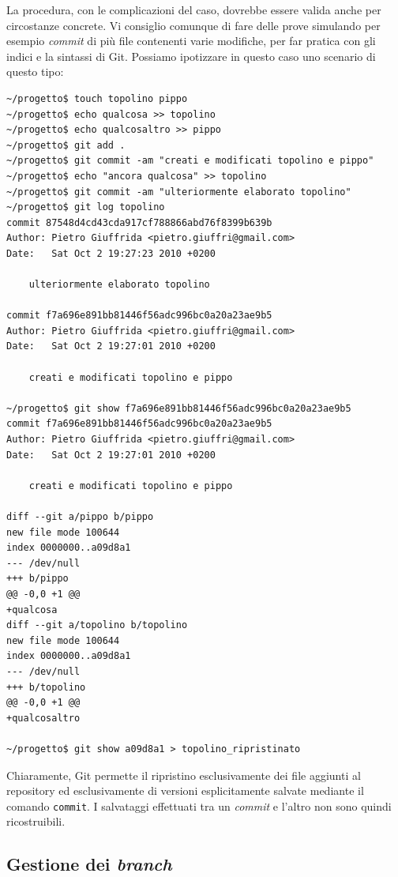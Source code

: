 \documentclass[a4paper,12pt,oneside]{article}
\begin{document}
La procedura, con le complicazioni del caso, dovrebbe essere valida anche per
circostanze concrete. Vi consiglio comunque di fare delle prove simulando per
esempio \emph{commit} di più file contenenti varie modifiche, per far pratica
con gli indici e la sintassi di Git.
Possiamo ipotizzare in questo caso uno scenario di questo tipo:
\begin{lstlisting}
~/progetto$ touch topolino pippo
~/progetto$ echo qualcosa >> topolino
~/progetto$ echo qualcosaltro >> pippo
~/progetto$ git add .
~/progetto$ git commit -am "creati e modificati topolino e pippo"
~/progetto$ echo "ancora qualcosa" >> topolino
~/progetto$ git commit -am "ulteriormente elaborato topolino"
~/progetto$ git log topolino
commit 87548d4cd43cda917cf788866abd76f8399b639b
Author: Pietro Giuffrida <pietro.giuffri@gmail.com>
Date:   Sat Oct 2 19:27:23 2010 +0200

    ulteriormente elaborato topolino

commit f7a696e891bb81446f56adc996bc0a20a23ae9b5
Author: Pietro Giuffrida <pietro.giuffri@gmail.com>
Date:   Sat Oct 2 19:27:01 2010 +0200

    creati e modificati topolino e pippo

~/progetto$ git show f7a696e891bb81446f56adc996bc0a20a23ae9b5
commit f7a696e891bb81446f56adc996bc0a20a23ae9b5
Author: Pietro Giuffrida <pietro.giuffri@gmail.com>
Date:   Sat Oct 2 19:27:01 2010 +0200

    creati e modificati topolino e pippo

diff --git a/pippo b/pippo
new file mode 100644
index 0000000..a09d8a1
--- /dev/null
+++ b/pippo
@@ -0,0 +1 @@
+qualcosa
diff --git a/topolino b/topolino
new file mode 100644
index 0000000..a09d8a1
--- /dev/null
+++ b/topolino
@@ -0,0 +1 @@
+qualcosaltro

~/progetto$ git show a09d8a1 > topolino_ripristinato
\end{lstlisting}

Chiaramente, Git permette il ripristino esclusivamente dei file aggiunti al
repository ed esclusivamente di versioni esplicitamente salvate mediante il
comando \lstinline|commit|. I salvataggi effettuati tra un \emph{commit} e
l'altro non sono quindi ricostruibili.

\subsection{Gestione dei \emph{branch}}
\label{sec:branch}
\end{document}
